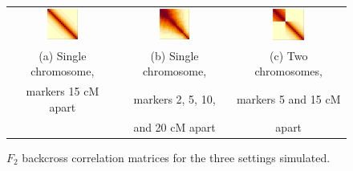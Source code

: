 \documentclass{article}
\begin{document}
\begin{figure}[htp]
  \begin{center}
    \begin{tabular}{ccc}
      \includegraphics[width = 0.300\textwidth]{./img/back1.png} &
      \includegraphics[width = 0.300\textwidth]{./img/back2.png} &
      \includegraphics[width = 0.300\textwidth]{./img/back3.png} \\
      {\footnotesize (a) Single chromosome,} &
      {\footnotesize (b) Single chromosome,} &
      {\footnotesize (c) Two chromosomes,} \\
      {\footnotesize markers 15 cM apart} &
      {\footnotesize markers 2, 5, 10, } &
      {\footnotesize markers 5 and 15 cM} \\
      &
      {\footnotesize and 20 cM apart} &
      {\footnotesize apart} \\ 
    \end{tabular}
  \end{center}
  \caption{$F_2$ backcross correlation matrices for the three settings simulated.}
  \label{fig:backsim}
\end{figure}
\end{document}
